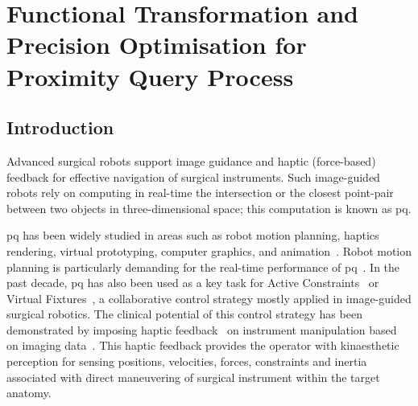 
\chapter[Functional Transformation \& Precision Optimisation for PQ Process]{Functional Transformation and Precision Optimisation for Proximity Query Process}

\label{ch:precision}

\section{Introduction}
\label{sec:intro}

Advanced surgical robots support image guidance and haptic (force-based) feedback for effective navigation of surgical instruments. 
Such image-guided robots rely on computing in real-time the intersection or the closest point-pair
between two objects in three-dimensional space; 
this computation is known as \gls{pq}.

\gls{pq} has been widely studied in areas such as robot motion planning, haptics rendering, virtual prototyping, computer graphics, and animation~\cite{gilbert90}.
Robot motion planning is particularly demanding for the real-time performance of \gls{pq}~\cite{chakraborty08}. 
In the past decade, \gls{pq} has also been used as a key task for Active Constraints~\cite{kwok10} or Virtual Fixtures~\cite{li07}, 
a collaborative control strategy mostly applied in image-guided surgical robotics. 
The clinical potential of this control strategy has been demonstrated by imposing haptic feedback~\cite{constantinescu05} on instrument manipulation based on imaging data~\cite{jakopec03}.
This haptic feedback provides the operator with kinaesthetic perception for sensing positions, velocities, forces, constraints and inertia associated with direct maneuvering of surgical
instrument within the target anatomy.

